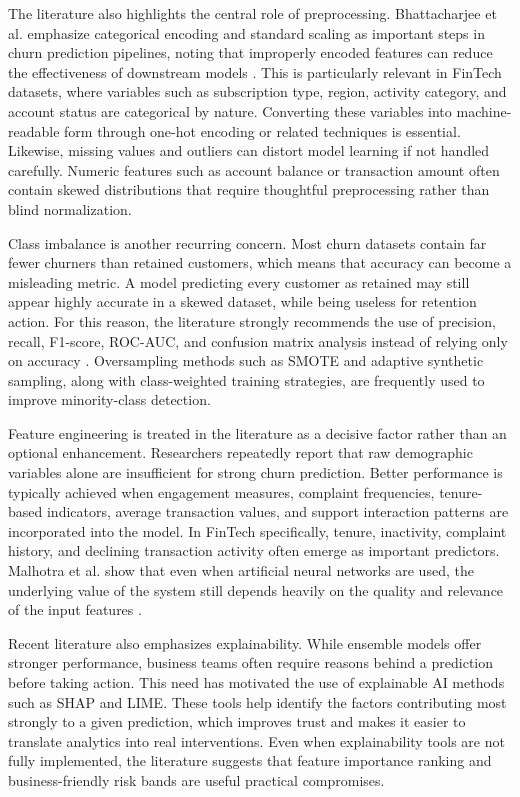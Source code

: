 The literature also highlights the central role of preprocessing. Bhattacharjee et al. emphasize categorical encoding and standard scaling as important steps in churn prediction pipelines, noting that improperly encoded features can reduce the effectiveness of downstream models \cite{bhattacharjee2026}. This is particularly relevant in FinTech datasets, where variables such as subscription type, region, activity category, and account status are categorical by nature. Converting these variables into machine-readable form through one-hot encoding or related techniques is essential. Likewise, missing values and outliers can distort model learning if not handled carefully. Numeric features such as account balance or transaction amount often contain skewed distributions that require thoughtful preprocessing rather than blind normalization.

Class imbalance is another recurring concern. Most churn datasets contain far fewer churners than retained customers, which means that accuracy can become a misleading metric. A model predicting every customer as retained may still appear highly accurate in a skewed dataset, while being useless for retention action. For this reason, the literature strongly recommends the use of precision, recall, F1-score, ROC-AUC, and confusion matrix analysis instead of relying only on accuracy \cite{systematicreview,imani2024}. Oversampling methods such as SMOTE and adaptive synthetic sampling, along with class-weighted training strategies, are frequently used to improve minority-class detection.

Feature engineering is treated in the literature as a decisive factor rather than an optional enhancement. Researchers repeatedly report that raw demographic variables alone are insufficient for strong churn prediction. Better performance is typically achieved when engagement measures, complaint frequencies, tenure-based indicators, average transaction values, and support interaction patterns are incorporated into the model. In FinTech specifically, tenure, inactivity, complaint history, and declining transaction activity often emerge as important predictors. Malhotra et al. show that even when artificial neural networks are used, the underlying value of the system still depends heavily on the quality and relevance of the input features \cite{malhotra2017}.

Recent literature also emphasizes explainability. While ensemble models offer stronger performance, business teams often require reasons behind a prediction before taking action. This need has motivated the use of explainable AI methods such as SHAP and LIME. These tools help identify the factors contributing most strongly to a given prediction, which improves trust and makes it easier to translate analytics into real interventions. Even when explainability tools are not fully implemented, the literature suggests that feature importance ranking and business-friendly risk bands are useful practical compromises.

